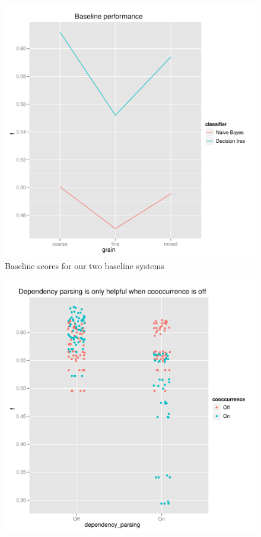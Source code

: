 \documentclass{article}
\begin{document}
\begin{figure}
\includegraphics[width=\textwidth]{baseline}
\caption{\label{fig:base}Baseline scores for our two baseline systems}
\end{figure}



\begin{figure}
\includegraphics[width=\textwidth]{pg_0001}
\caption{\label{fig1}}
\end{figure}
\end{document}

